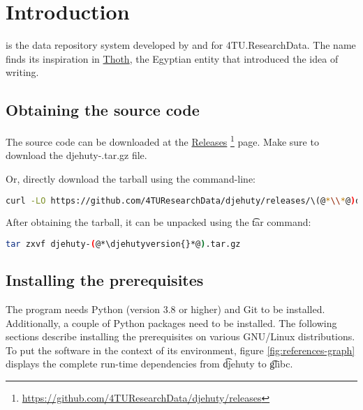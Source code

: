 \chapter{Introduction}

 is the data repository system developed by and for
4TU.ResearchData.  The name finds its inspiration in
\href{https://en.wikipedia.org/wiki/Thoth}{Thoth}, the Egyptian
entity that introduced the idea of writing.

\section{Obtaining the source code}
\label{sec:obtaining-tarball}

  \begin{sloppypar}
  The source code can be downloaded at the
  \href{https://github.com/4TUResearchData/djehuty/releases}%
  {Releases}%
  \footnote{\url{https://github.com/4TUResearchData/djehuty/releases}}
  page.  Make sure to download the {\fontfamily{\ttdefault}\selectfont
    djehuty-\djehutyversion{}.tar.gz} file.
  \end{sloppypar}

  Or, directly download the tarball using the command-line:

\begin{lstlisting}[language=bash]
curl -LO https://github.com/4TUResearchData/djehuty/releases/\(@*\\*@)download/v(@*\djehutyversion{}*@)/djehuty-(@*\djehutyversion{}*@).tar.gz
\end{lstlisting}

  After obtaining the tarball, it can be unpacked using the \t{tar}
  command:

\begin{lstlisting}[language=bash]
tar zxvf djehuty-(@*\djehutyversion{}*@).tar.gz
\end{lstlisting}

\section{Installing the prerequisites}
\label{sec:prerequisites}

  The  program needs Python (version 3.8 or higher) and
  Git to be installed.  Additionally, a couple of Python packages need
  to be installed.  The following sections describe installing the
  prerequisites on various GNU/Linux distributions.  To put the software in
  the context of its environment, figure \ref{fig:references-graph} displays
  the complete run-time dependencies from \t{djehuty} to \t{glibc}.

